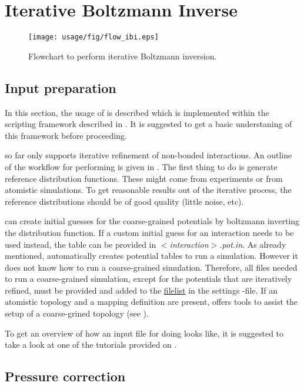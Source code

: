 \section{Iterative Boltzmann Inverse}
\begin{figure}
   \centering
   \texttt{[image: usage/fig/flow\_ibi.eps]}
   \caption{\label{fig:flow_ibi}Flowchart to perform iterative Boltzmann inversion.}
\end{figure}

\subsection{Input preparation}
In this section, the usage of \ibi is described which is implemented within the scripting framework described in . It is suggested to get a basic understaning of this framework before proceeding.

\ibi so far only supports iterative refinement of non-bonded interactions. An outline of the workflow for performing \ibi is given in . The first thing to do is generate reference distribution functions. These might come from experiments or from atomistic simulations. To get reasonable results out of the iterative process, the reference distributions should be of good quality (little noise, etc).

\votca can create initial guesses for the coarse-grained potentials by boltzmann inverting the distribution function. If a custom initial guess for an interaction needs to be used instead, the table can be provided in \textit{$<$interaction$>$.pot.in}. As already mentioned, \votca automatically creates potential tables to run a simulation. However it does not know how to run a coarse-grained simulation. Therefore, all files needed to run a coarse-grained simulation, except for the potentials that are iteratively refined, must be provided and added to the \hyperlink{\cgref{inverse.filelist}}{filelist} in the settings \xml-file. If an atomistic topology and a mapping definition are present, \votca offers tools to assist the setup of a  coarse-grined topology (see ).

To get an overview of how an input file for doing \ibi looks like, it is suggested to take a look at one of the tutorials provided on \votcaweb.

\subsection{Pressure correction}

